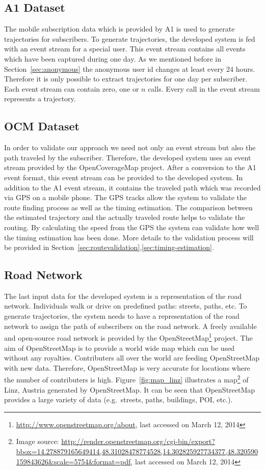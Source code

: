 \documentclass[master,english]{hgbthesis}
\begin{document}
\subsection{A1 Dataset}

The mobile subscription data which is provided by A1 is used to generate trajectories for subscribers. To generate trajectories, the developed system is fed with an event stream for a special user. This event stream contains all events which have been captured during one day. As we mentioned before in Section~\ref{sec:anonymous} the anonymous user id changes at least every 24 hours. Therefore it is only possible to extract trajectories for one day per subscriber. Each event stream can contain zero, one or $n$ calls. Every call in the event stream represents a trajectory.

\subsection{OCM Dataset}

In order to validate our approach we need not only an event stream but also the path traveled by the subscriber. Therefore, the developed system uses an event stream provided by the OpenCoverageMap project. After a conversion to the A1 event format, this event stream can be provided to the developed system. In addition to the A1 event stream, it contains the traveled path which was recorded via GPS on a mobile phone. The GPS tracks allow the system to validate the route finding process as well as the timing estimation. The comparison between the estimated trajectory and the actually traveled route helps to validate the routing. By calculating the speed from the GPS the system can validate how well the timing estimation has been done. More details to the validation process will be provided in Section~\ref{sec:routevalidation},\ref{sec:timing-estimation}.

\subsection{Road Network}

The last input data for the developed system is a representation of the road network. Individuals walk or drive on predefined paths: streets, paths, etc. To generate trajectories, the system needs to have a representation of the road network to assign the path of subscribers on the road network. A freely available and open-source road network is provided by the OpenStreetMap\footnote{\url{http://www.openstreetmap.org/about}, last accessed on March 12, 2014} project. The aim of OpenStreetMap is to provide a world wide map which can be used without any royalties. Contributers all over the world are feeding OpenStreetMap with new data. Therefore, OpenStreetMap is very accurate for locations where the number of contributers is high. Figure~\ref{fig:map_linz} illustrates a map\footnote{Image source: \url{http://render.openstreetmap.org/cgi-bin/export?bbox=14.278879165649414,48.31028478774528,14.302825927734377,48.320590159843626&scale=5754&format=pdf}, last accessed on March 12, 2014} of Linz, Austria generated by OpenStreetMap. It can be seen that OpenStreetMap provides a large variety of data (e.g.\ streets, paths, buildings, POI, etc.).
\end{document}
